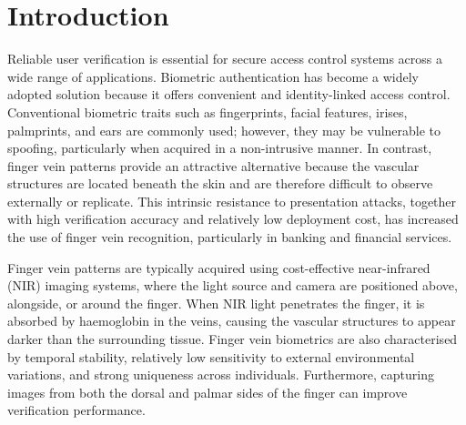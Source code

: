 \documentclass[10pt,journal,compsoc]{IEEEtran}
\begin{document}
\maketitle


\IEEEdisplaynontitleabstractindextext
\IEEEpeerreviewmaketitle

\section{Introduction}

Reliable user verification is essential for secure access control systems across a wide range of applications. Biometric authentication has become a widely adopted solution because it offers convenient and identity-linked access control. Conventional biometric traits such as fingerprints, facial features, irises, palmprints, and ears are commonly used; however, they may be vulnerable to spoofing, particularly when acquired in a non-intrusive manner. In contrast, finger vein patterns provide an attractive alternative because the vascular structures are located beneath the skin and are therefore difficult to observe externally or replicate. This intrinsic resistance to presentation attacks, together with high verification accuracy and relatively low deployment cost, has increased the use of finger vein recognition, particularly in banking and financial services.

Finger vein patterns are typically acquired using cost-effective near-infrared (NIR) imaging systems, where the light source and camera are positioned above, alongside, or around the finger. When NIR light penetrates the finger, it is absorbed by haemoglobin in the veins, causing the vascular structures to appear darker than the surrounding tissue. Finger vein biometrics are also characterised by temporal stability, relatively low sensitivity to external environmental variations, and strong uniqueness across individuals. Furthermore, capturing images from both the dorsal and palmar sides of the finger can improve verification performance.
\end{document}
